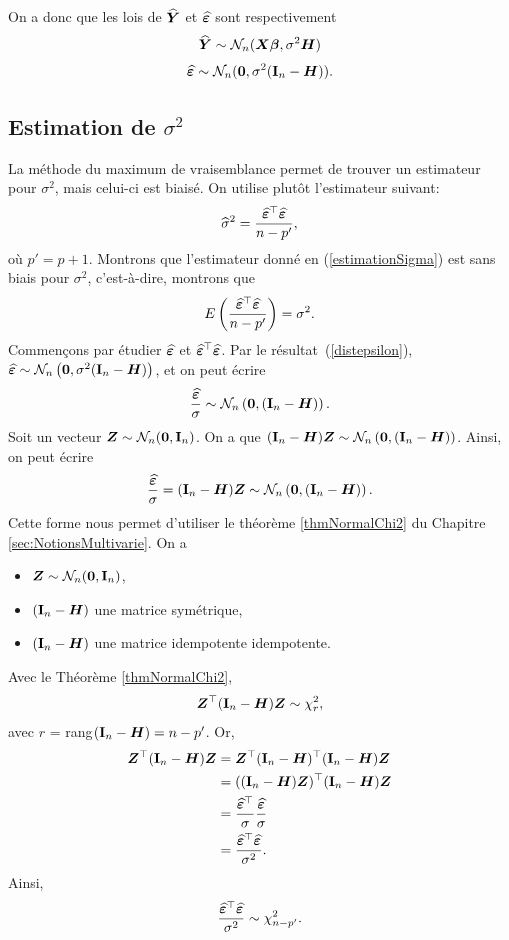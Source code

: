 On a donc que les lois de $\widehat{\bm{Y}}$ et $\widehat{\bm\varepsilon}$ sont respectivement
\begin{eqnarray*}
	\widehat{\bm{Y}} \sim \mathcal{N}_n(\bm{X}\bm\beta, \sigma^2\bm{H})
\end{eqnarray*}
\begin{eqnarray}
	\widehat{\bm\varepsilon} \sim \mathcal{N}_n(\bold{0}, \sigma^2(\bold{I}_n-\bm{H})).
	\label{distepsilon}
\end{eqnarray}


\subsection{Estimation de $\sigma^2$}
\label{sec:RLM-sigma}

La méthode du maximum de vraisemblance permet de trouver un estimateur pour $\sigma^2$, mais celui-ci est biaisé. On utilise plutôt l'estimateur suivant:
\begin{eqnarray}
	\widehat{\sigma}^2=\frac{\widehat{\bm\varepsilon}^\top\widehat{\bm\varepsilon}}{n-p'},
	\label{estimationSigma}
\end{eqnarray}
où $p'=p+1$.
Montrons que l'estimateur donné en (\ref{estimationSigma}) est sans biais pour $\sigma^2$, c'est-à-dire, montrons que
$$ E \left( \frac{\widehat{\bm\varepsilon}^\top\widehat{\bm\varepsilon}}{n-p'} \right) = \sigma^2. $$
Commençons par étudier $\widehat{\bm\varepsilon}$ et $\widehat{\bm\varepsilon}^\top\widehat{\bm\varepsilon}$.
Par  le résultat~(\ref{distepsilon}), $\widehat{\bm\varepsilon} \sim \mathcal{N}_n\left(\bold{0}, \sigma^2(\bold{I}_n-\bm{H})\right)$, et on peut écrire
$$ \frac{\widehat{\bm\varepsilon}}{\sigma} \sim \mathcal{N}_n\left(\bold{0}, (\bold{I}_n-\bm{H})\right).$$
Soit un vecteur $\bm{Z} \sim \mathcal{N}_n(\bm{0}, \bold{I}_n)$. On a que $(\bold{I}_n - \bm{H})\bm{Z} \sim \mathcal{N}_n\left(\bold{0}, (\bold{I}_n-\bm{H})\right)$. Ainsi, on peut écrire 
$$ \frac{\widehat{\bm\varepsilon}}{\sigma} = (\bold{I}_n - \bm{H})\bm{Z} \sim \mathcal{N}_n\left(\bold{0}, (\bold{I}_n-\bm{H})\right).$$
Cette forme nous permet d'utiliser le théorème \ref{thmNormalChi2} du Chapitre \ref{sec:NotionsMultivarie}. On a 
\begin{itemize}
\item[$\bullet$] $\bm{Z} \sim \mathcal{N}_n(\bm{0},\bold{I}_n)$,
\item[$\bullet$] $(\bold{I}_n-\bm{H})$ une matrice symétrique,
\item[$\bullet$] $(\bold{I}_n-\bm{H})$ une matrice idempotente idempotente.
\end{itemize}
Avec le Théorème \ref{thmNormalChi2},
$$ \bm{Z}^\top(\bold{I}_n-\bm{H}) \bm{Z} \sim \chi^2_r,$$
avec $r$ = rang$(\bold{I}_n-\bm{H}) = n-p'$. 
Or,
\begin{align*}
\bm{Z}^\top(\bold{I}_n-\bm{H}) \bm{Z} &= \bm{Z}^\top(\bold{I}_n-\bm{H})^\top(\bold{I}_n-\bm{H}) \bm{Z} \\
&= ((\bold{I}_n-\bm{H})\bm{Z})^\top (\bold{I}_n-\bm{H}) \bm{Z} \\
&= \frac{\widehat{\bm\varepsilon}^\top}{\sigma} \frac{\widehat{\bm\varepsilon}}{\sigma} \\
&= \frac{\widehat{\bm\varepsilon}^\top\widehat{\bm\varepsilon}}{\sigma^2}.
\end{align*}
Ainsi,
$$ \frac{\widehat{\bm\varepsilon}^\top\widehat{\bm\varepsilon}}{\sigma^2} \sim \chi^2_{n-p'}.$$


